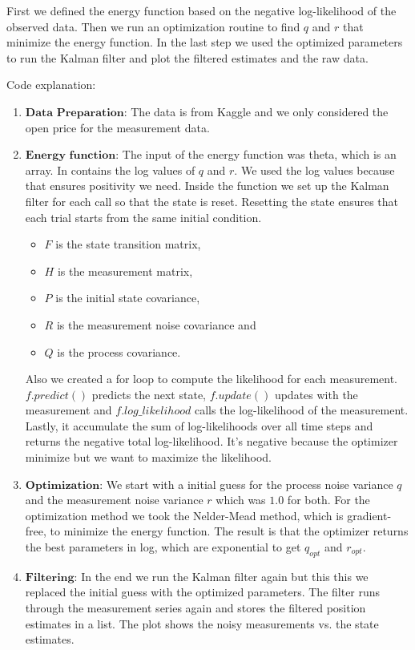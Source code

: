 First we defined the energy function based on the negative log-likelihood of the observed data. Then we run an optimization routine to find $q$ and $r$ that minimize the energy function. In the last step we used the optimized parameters to run the Kalman filter and plot the filtered estimates and the raw data. 

Code explanation: 
\begin{enumerate}
    \item $\textbf{Data Preparation}$: The data is from Kaggle and we only considered the open price for the measurement data. 
    \item $\textbf{Energy function}$: The input of the energy function was theta, which is an array. In contains the log values of $q$ and $r$. We used the log values because that ensures positivity we need. Inside the function we set up the Kalman filter for each call so that the state is reset. Resetting the state ensures that each trial starts from the same initial condition.
    \begin{itemize}
        \item $F$ is the state transition matrix,
        \item $H$ is the measurement matrix,
        \item $P$ is the initial state covariance,
        \item $R$ is the measurement noise covariance and
        \item $Q$ is the process covariance.
    \end{itemize}
    Also we created a for loop to compute the likelihood for each measurement. $f.predict()$ predicts the next state, $f.update()$ updates with the measurement and $f.log\_likelihood$ calls the log-likelihood of the measurement. Lastly, it accumulate the sum of log-likelihoods over all time steps and returns the negative total log-likelihood. It's negative because the optimizer minimize but we want to maximize the likelihood.
    \item $\textbf{Optimization}$: We start with a initial guess for the process noise variance $q$ and the measurement noise variance $r$ which was $1.0$ for both. For the optimization method we took the Nelder-Mead method, which is gradient-free, to minimize the energy function. The result is that the optimizer returns the best parameters in log, which are exponential to get $q_{opt}$ and $r_{opt}$.
    \item $\textbf{Filtering}$: In the end we run the Kalman filter again but this this we replaced the initial guess with the optimized parameters. The filter runs through the measurement series again and stores the filtered position estimates in a list. The plot shows the noisy measurements vs. the state estimates. 
\end{enumerate}


